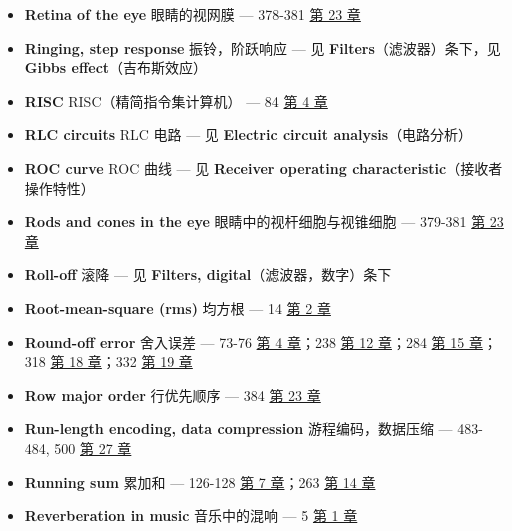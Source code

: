 \begin{itemize}
  \begin{itemize}
  \tightlist
  \item
    frequency domain：频域分辨率 --- 173-176 
    \hyperref[ch-09]{第 9 章}
  \item
    limiting resolution, images：极限分辨率，图像 --- 426 
    \hyperref[ch-25]{第 25 章}
  \item
    spatial domain：空间域分辨率 --- 423-432 
    \hyperref[ch-25]{第 25 章}
  \end{itemize}
\item
  \textbf{Retina of the eye} 眼睛的视网膜 --- 378-381 
  \hyperref[ch-23]{第 23 章}
\item
  \textbf{Ringing, step response} 振铃，阶跃响应 --- 见
  \textbf{Filters}（滤波器）条下，见 \textbf{Gibbs effect}（吉布斯效应）
\item
  \textbf{RISC} RISC（精简指令集计算机） --- 84 
  \hyperref[ch-04]{第 4 章}
\item
  \textbf{RLC circuits} RLC 电路 --- 见 \textbf{Electric circuit
  analysis}（电路分析）
\item
  \textbf{ROC curve} ROC 曲线 --- 见 \textbf{Receiver operating
  characteristic}（接收者操作特性）
\item
  \textbf{Rods and cones in the eye} 眼睛中的视杆细胞与视锥细胞 ---
  379-381  \hyperref[ch-23]{第 23 章}
\item
  \textbf{Roll-off} 滚降 --- 见 \textbf{Filters,
  digital}（滤波器，数字）条下
\item
  \textbf{Root-mean-square (rms)} 均方根 --- 14 
  \hyperref[ch-02]{第 2 章}
\item
  \textbf{Round-off error} 舍入误差 --- 73-76 
  \hyperref[ch-04]{第 4 章}；238  \hyperref[ch-12]{第 12
  章}；284  \hyperref[ch-15]{第 15 章}；318 
  \hyperref[ch-18]{第 18 章}；332  \hyperref[ch-19]{第 19 章}
\item
  \textbf{Row major order} 行优先顺序 --- 384 
  \hyperref[ch-23]{第 23 章}
\item
  \textbf{Run-length encoding, data compression} 游程编码，数据压缩 ---
  483-484, 500  \hyperref[ch-27]{第 27 章}
\item
  \textbf{Running sum} 累加和 --- 126-128  \hyperref[ch-07]{第
  7 章}；263  \hyperref[ch-14]{第 14 章}
\item
  \textbf{Reverberation in music} 音乐中的混响 --- 5 
  \hyperref[ch-01]{第 1 章}
\end{itemize}

